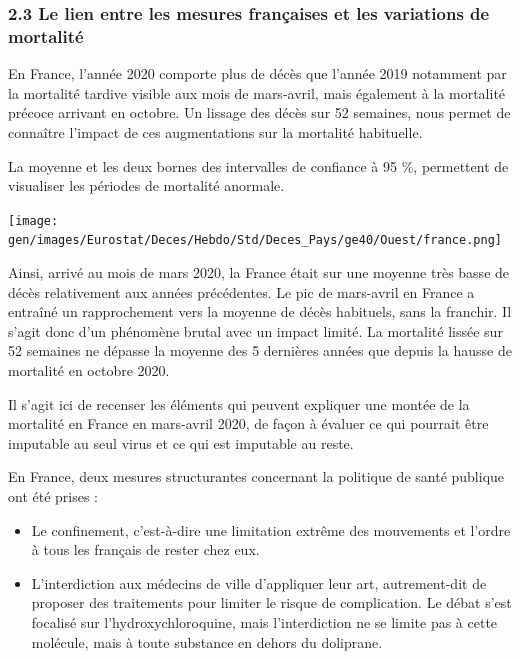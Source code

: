 \documentclass[
]{article}
\begin{document}
\hypertarget{le-lien-entre-les-mesures-franuxe7aises-et-les-variations-de-mortalituxe9}{%
\subsubsection{2.3 Le lien entre les mesures françaises et les
variations de
mortalité}\label{le-lien-entre-les-mesures-franuxe7aises-et-les-variations-de-mortalituxe9}}

En France, l'année 2020 comporte plus de décès que l'année 2019
notamment par la mortalité tardive visible aux mois de mars-avril, mais
également à la mortalité précoce arrivant en octobre. Un lissage des
décès sur 52 semaines, nous permet de connaître l'impact de ces
augmentations sur la mortalité habituelle.

La moyenne et les deux bornes des intervalles de confiance à 95 \%,
permettent de visualiser les périodes de mortalité anormale.

\texttt{[image: gen/images/Eurostat/Deces/Hebdo/Std/Deces\_Pays/ge40/Ouest/france.png]}

Ainsi, arrivé au mois de mars 2020, la France était sur une moyenne très
basse de décès relativement aux années précédentes. Le pic de mars-avril
en France a entraîné un rapprochement vers la moyenne de décès
habituels, sans la franchir. Il s'agit donc d'un phénomène brutal avec
un impact limité. La mortalité lissée sur 52 semaines ne dépasse la
moyenne des 5 dernières années que depuis la hausse de mortalité en
octobre 2020.

Il s'agit ici de recenser les éléments qui peuvent expliquer une montée
de la mortalité en France en mars-avril 2020, de façon à évaluer ce qui
pourrait être imputable au seul virus et ce qui est imputable au reste.

En France, deux mesures structurantes concernant la politique de santé
publique ont été prises :

\begin{itemize}
\item
  Le confinement, c'est-à-dire une limitation extrême des mouvements et
  l'ordre à tous les français de rester chez eux.
\item
  L'interdiction aux médecins de ville d'appliquer leur art,
  autrement-dit de proposer des traitements pour limiter le risque de
  complication. Le débat s'est focalisé sur l'hydroxychloroquine, mais
  l'interdiction ne se limite pas à cette molécule, mais à toute
  substance en dehors du doliprane.
\end{itemize}
\end{document}
